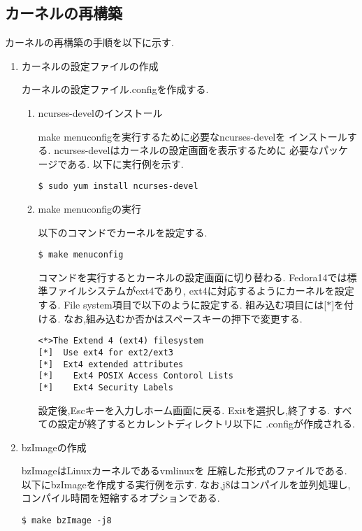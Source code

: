 \documentclass[12pt]{jsarticle}
\begin{document}
\subsection{カーネルの再構築}
カーネルの再構築の手順を以下に示す.
\begin{enumerate}
\item カーネルの設定ファイルの作成

カーネルの設定ファイル.configを作成する.
\begin{enumerate}
\item ncurses-develのインストール

make menuconfigを実行するために必要なncurses-develを
インストールする.
ncurses-develはカーネルの設定画面を表示するために
必要なパッケージである.
以下に実行例を示す.


\begin{verbatim}
$ sudo yum install ncurses-devel
\end{verbatim}


\item make menuconfigの実行

以下のコマンドでカーネルを設定する.


\begin{verbatim}
$ make menuconfig
\end{verbatim}


コマンドを実行するとカーネルの設定画面に切り替わる.
Fedora14では標準ファイルシステムがext4であり,
ext4に対応するようにカーネルを設定する.
File system項目で以下のように設定する.
組み込む項目には[$\ast$]を付ける.
なお,組み込むか否かはスペースキーの押下で変更する.


\begin{verbatim}
<*>The Extend 4 (ext4) filesystem
[*]  Use ext4 for ext2/ext3
[*]  Ext4 extended attributes
[*]    Ext4 POSIX Access Contorol Lists
[*]    Ext4 Security Labels
\end{verbatim}


設定後,Escキーを入力しホーム画面に戻る.
Exitを選択し,終了する.
すべての設定が終了するとカレントディレクトリ以下に
.configが作成される.
\end{enumerate}
\item bzImageの作成

bzImageはLinuxカーネルであるvmlinuxを
圧縮した形式のファイルである.
以下にbzImageを作成する実行例を示す.
なお,j8はコンパイルを並列処理し,
コンパイル時間を短縮するオプションである.

\begin{verbatim}
$ make bzImage -j8
\end{verbatim}


\end{enumerate}
\end{document}
